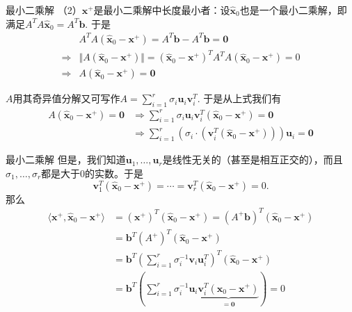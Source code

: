 \begin{frame}

\begin{block}{最小二乘解}
（2）$\mathbf{x}^+$是最小二乘解中长度最小者：设$\widehat{\mathbf{x}}_0$也是一个最小二乘解，即满足$A^TA\widehat{\mathbf{x}}_0 = A^T\mathbf{b}$. 于是
\begin{align*}
& A^TA(\widehat{\mathbf{x}}_0-\mathbf{x}^+) = A^T\mathbf{b} - A^T\mathbf{b} = \mathbf{0} \\
\Longrightarrow & \Vert A (\widehat{\mathbf{x}}_0-\mathbf{x}^+) \Vert = (\widehat{\mathbf{x}}_0-\mathbf{x}^+)^T A^TA (\widehat{\mathbf{x}}_0-\mathbf{x}^+) = 0 \\
\Longrightarrow & A (\widehat{\mathbf{x}}_0-\mathbf{x}^+) = \mathbf{0}
\end{align*}

\pause

$A$用其奇异值分解又可写作$A = \sum\limits_{i=1}^r \sigma_i \mathbf{u}_i \mathbf{v}_i^T$. 于是从上式我们有
\begin{align*}
A (\widehat{\mathbf{x}}_0-\mathbf{x}^+) = \mathbf{0} & \Longrightarrow \sum\limits_{i=1}^r \sigma_i \mathbf{u}_i \mathbf{v}_i^T (\widehat{\mathbf{x}}_0-\mathbf{x}^+) = \mathbf{0} \\
& \Longrightarrow \sum\limits_{i=1}^r \left( \sigma_i \cdot \left( \mathbf{v}_i^T (\widehat{\mathbf{x}}_0-\mathbf{x}^+) \right) \right) \mathbf{u}_i = \mathbf{0}
\end{align*}
\end{block}

\end{frame}


\begin{frame}

\begin{block}{最小二乘解}
但是，我们知道$\mathbf{u}_1,\ldots,\mathbf{u}_r$是线性无关的（甚至是相互正交的），而且$\sigma_1,\ldots,\sigma_r$都是大于0的实数。于是
$$\mathbf{v}_1^T (\widehat{\mathbf{x}}_0-\mathbf{x}^+) = \cdots = \mathbf{v}_r^T (\widehat{\mathbf{x}}_0-\mathbf{x}^+) = 0.$$
那么
\begin{align*}
\langle \mathbf{x}^+, \widehat{\mathbf{x}}_0 - \mathbf{x}^+ \rangle & = (\mathbf{x}^+)^T (\widehat{\mathbf{x}}_0 - \mathbf{x}^+) = (A^+\mathbf{b})^T (\widehat{\mathbf{x}}_0 - \mathbf{x}^+) \\
& = \mathbf{b}^T (A^+)^T (\widehat{\mathbf{x}}_0 - \mathbf{x}^+) \\
& = \mathbf{b}^T \left( \sum\limits_{i=1}^r \sigma_i^{-1} \mathbf{v}_i \mathbf{u}_i^T \right)^T (\widehat{\mathbf{x}}_0 - \mathbf{x}^+) \\
& = \mathbf{b}^T \left( \sum\limits_{i=1}^r \sigma_i^{-1} \mathbf{u}_i \underbrace{\mathbf{v}_i^T (\widehat{\mathbf{x}}_0 - \mathbf{x}^+)}_{=\mathbf{0}} \right) = 0
\end{align*}
\end{block}

\end{frame}

